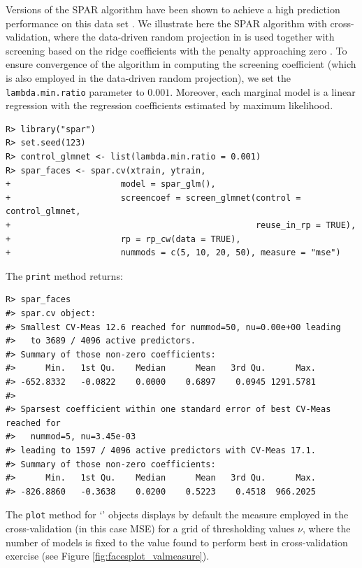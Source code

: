 \documentclass[
  article,
  nojss]{jss}
\newcommand{\class}[1]{`\code{#1}'}
\begin{document}
Versions of the SPAR algorithm have been shown to achieve a high
prediction performance on this data set \citep[see][]{parzer2024sparse}.
We illustrate here the SPAR algorithm with cross-validation, where the
data-driven random projection in \citet{parzer2024sparse} is used
together with screening based on the ridge coefficients with the penalty
approaching zero \citep{Wang2015HOLP}. To ensure convergence of the
 algorithm in computing the screening coefficient (which is
also employed in the data-driven random projection), we set the
\texttt{lambda.min.ratio} parameter to \(0.001\). Moreover, each
marginal model is a linear regression with the regression coefficients
estimated by maximum likelihood.

\begin{verbatim}
R> library("spar")
R> set.seed(123)
R> control_glmnet <- list(lambda.min.ratio = 0.001)
R> spar_faces <- spar.cv(xtrain, ytrain,
+                      model = spar_glm(),
+                      screencoef = screen_glmnet(control = control_glmnet, 
+                                                 reuse_in_rp = TRUE),
+                      rp = rp_cw(data = TRUE),
+                      nummods = c(5, 10, 20, 50), measure = "mse")
\end{verbatim}

The \texttt{print} method returns:

\begin{verbatim}
R> spar_faces
#> spar.cv object:
#> Smallest CV-Meas 12.6 reached for nummod=50, nu=0.00e+00 leading
#>   to 3689 / 4096 active predictors.
#> Summary of those non-zero coefficients:
#>      Min.   1st Qu.    Median      Mean   3rd Qu.      Max. 
#> -652.8332   -0.0822    0.0000    0.6897    0.0945 1291.5781 
#> 
#> Sparsest coefficient within one standard error of best CV-Meas reached for
#>   nummod=5, nu=3.45e-03 
#> leading to 1597 / 4096 active predictors with CV-Meas 17.1.
#> Summary of those non-zero coefficients:
#>      Min.   1st Qu.    Median      Mean   3rd Qu.      Max. 
#> -826.8860   -0.3638    0.0200    0.5223    0.4518  966.2025
\end{verbatim}

The \texttt{plot} method for \class{spar.cv} objects displays by default
the measure employed in the cross-validation (in this case MSE) for a
grid of thresholding values \(\nu\), where the number of models is fixed
to the value found to perform best in cross-validation exercise (see
Figure \ref{fig:facesplot_valmeasure}).
\end{document}
